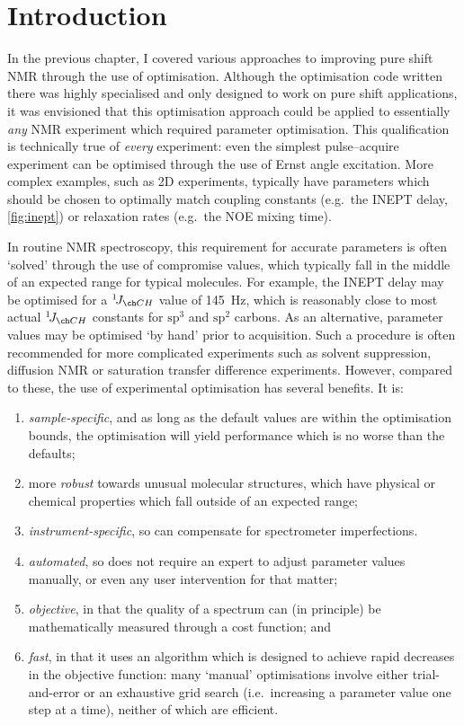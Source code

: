 \section{Introduction}
\label{sec:poise__introduction}

In the previous chapter, I covered various approaches to improving pure shift NMR through the use of optimisation.
Although the optimisation code written there was highly specialised and only designed to work on pure shift applications, it was envisioned that this optimisation approach could be applied to essentially \textit{any} NMR experiment which required parameter optimisation.
This qualification is technically true of \textit{every} experiment: even the simplest pulse--acquire experiment can be optimised through the use of Ernst angle excitation.
More complex examples, such as 2D experiments, typically have parameters which should be chosen to optimally match coupling constants (e.g.\ the INEPT delay, \cref{fig:inept}) or relaxation rates (e.g.\ the NOE mixing time).

In routine NMR spectroscopy, this requirement for accurate parameters is often `solved' through the use of compromise values, which typically fall in the middle of an expected range for typical molecules.
For example, the INEPT delay may be optimised for a $\oneJ{CH}$ value of \qty{145}{\Hz}, which is reasonably close to most actual $\oneJ{CH}$ constants for $\mathrm{sp^3}$ and $\mathrm{sp^2}$ carbons.
As an alternative, parameter values may be optimised `by hand' prior to acquisition.
Such a procedure is often recommended for more complicated experiments such as solvent suppression, diffusion NMR or saturation transfer difference experiments.
However, compared to these, the use of experimental optimisation has several benefits.
It is:
\begin{enumerate}
    \item \textit{sample-specific}, and as long as the default values are within the optimisation bounds, the optimisation will yield performance which is no worse than the defaults;
    \item more \textit{robust} towards unusual molecular structures, which have physical or chemical properties which fall outside of an expected range;
    \item \textit{instrument-specific}, so can compensate for spectrometer imperfections.
    \item \textit{automated}, so does not require an expert to adjust parameter values manually, or even any user intervention for that matter;
    \item \textit{objective}, in that the quality of a spectrum can (in principle) be mathematically measured through a cost function; and
    \item \textit{fast}, in that it uses an algorithm which is designed to achieve rapid decreases in the objective function: many `manual' optimisations involve either trial-and-error or an exhaustive grid search (i.e.\ increasing a parameter value one step at a time), neither of which are efficient.
\end{enumerate}

